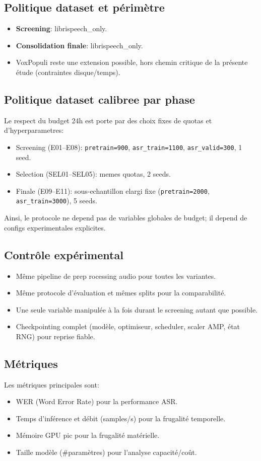 \documentclass[11pt,a4paper]{article}
\begin{document}
\subsection{Politique dataset et périmètre}
\begin{itemize}
\item \textbf{Screening}: librispeech\_only.
\item \textbf{Consolidation finale}: librispeech\_only.
\item VoxPopuli reste une extension possible, hors chemin critique de la présente étude (contraintes disque/temps).
\end{itemize}

\subsection{Politique dataset calibree par phase}
Le respect du budget 24h est porte par des choix fixes de quotas et d'hyperparametres:
\begin{itemize}
\item Screening (E01--E08): \texttt{pretrain=900}, \texttt{asr\_train=1100}, \texttt{asr\_valid=300}, 1 seed.
\item Selection (SEL01--SEL05): memes quotas, 2 seeds.
\item Finale (E09--E11): sous-echantillon elargi fixe (\texttt{pretrain=2000}, \texttt{asr\_train=3000}), 5 seeds.
\end{itemize}
Ainsi, le protocole ne depend pas de variables globales de budget; il depend de configs experimentales explicites.

\subsection{Contrôle expérimental}
\begin{itemize}
\item Même pipeline de prep rocessing audio pour toutes les variantes.
\item Même protocole d'évaluation et mêmes splits pour la comparabilité.
\item Une seule variable manipulée à la fois durant le screening autant que possible.
\item Checkpointing complet (modèle, optimiseur, scheduler, scaler AMP, état RNG) pour reprise fiable.
\end{itemize}

\subsection{Métriques}
Les métriques principales sont:
\begin{itemize}
\item WER (Word Error Rate) pour la performance ASR.
\item Temps d'inférence et débit (samples/s) pour la frugalité temporelle.
\item Mémoire GPU pic pour la frugalité matérielle.
\item Taille modèle (\#paramètres) pour l'analyse capacité/coût.
\end{itemize}
\end{document}
